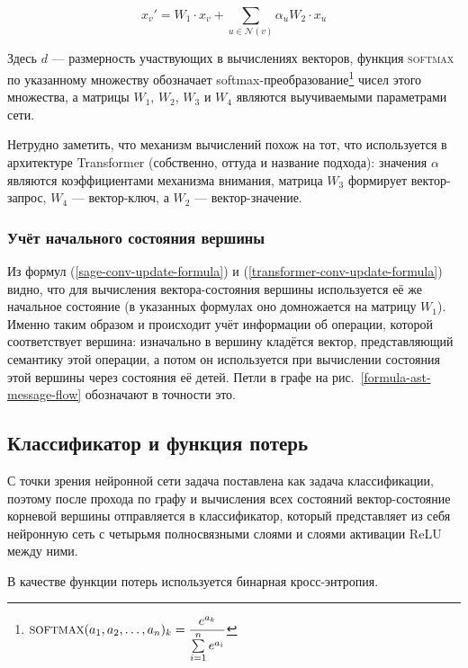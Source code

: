 \begin{equation} \label{transformer-conv-update-formula}
    x_v' = W_1 \cdot x_v + \sum_{u \in \mathcal{N}(v)} \alpha_u W_2 \cdot x_u
\end{equation}

Здесь $d$ --- размерность участвующих в вычислениях векторов, функция \textsc{softmax} по указанному множеству обозначает softmax-преобразование\footnote{$\text{\textsc{softmax}}(a_1, a_2, \ldots, a_n)_k = \dfrac{e^{a_k}}{\sum \limits_{i = 1}^n e^{a_i}}$} чисел этого множества, а матрицы $W_1$, $W_2$, $W_3$ и $W_4$ являются выучиваемыми параметрами сети.

Нетрудно заметить, что механизм вычислений похож на тот, что используется в архитектуре Transformer \cite{attention-is-all-you-need} (собственно, оттуда и название подхода): значения $\alpha$ являются коэффициентами механизма внимания, матрица $W_3$ формирует вектор-запрос, $W_4$ --- вектор-ключ, а $W_2$ --- вектор-значение.

\subsubsection{Учёт начального состояния вершины}

Из формул (\ref{sage-conv-update-formula}) и (\ref{transformer-conv-update-formula}) видно, что для вычисления вектора-состояния вершины используется её же начальное состояние (в указанных формулах оно домножается на матрицу $W_1$). Именно таким образом и происходит учёт информации об операции, которой соответствует вершина: изначально в вершину кладётся вектор, представляющий семантику этой операции, а потом он используется при вычислении состояния этой вершины через состояния её детей. Петли в графе на рис.~\ref{formula-ast-message-flow} обозначают в точности это.

\subsection{Классификатор и функция потерь}

С точки зрения нейронной сети задача поставлена как задача классификации, поэтому после прохода по графу и вычисления всех состояний вектор-состояние корневой вершины отправляется в классификатор, который представляет из себя нейронную сеть с четырьмя полносвязными слоями и слоями активации ReLU между ними.

В качестве функции потерь используется бинарная кросс-энтропия.

